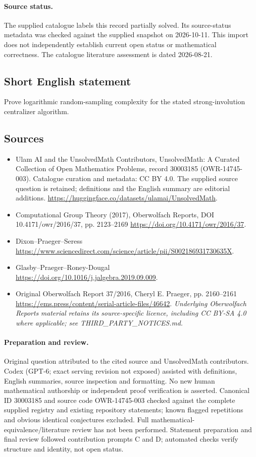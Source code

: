 \documentclass[11pt]{article}
\begin{document}
\paragraph{Source status.}
The supplied catalogue labels this record partially solved. Its source-status metadata was checked against the supplied snapshot on 2026-10-11. This import does not independently establish current open status or mathematical correctness. The catalogue literature assessment is dated 2026-08-21.
\subsection{Short English statement}
Prove logarithmic random-sampling complexity for the stated strong-involution centralizer algorithm.
\subsection{Sources}
\begin{itemize}
\item[\hypertarget{source:30003185:1}{S1}] Ulam AI and the UnsolvedMath Contributors, UnsolvedMath: A Curated Collection of Open Mathematics Problems, record 30003185 (OWR-14745-003). Catalogue curation and metadata: CC BY 4.0. The supplied source question is retained; definitions and the English summary are editorial additions.
\url{https://huggingface.co/datasets/ulamai/UnsolvedMath}.
\item[\hypertarget{source:30003185:2}{S2}] Computational Group Theory (2017), Oberwolfach Reports, DOI 10.4171/owr/2016/37, pp. 2123--2169
\url{https://doi.org/10.4171/owr/2016/37}.
\item[\hypertarget{source:30003185:3}{S3}] Dixon--Praeger--Seress
\url{https://www.sciencedirect.com/science/article/pii/S002186931730635X}.
\item[\hypertarget{source:30003185:4}{S4}] Glasby--Praeger--Roney-Dougal
\url{https://doi.org/10.1016/j.jalgebra.2019.09.009}.
\item[\hypertarget{source:30003185:5}{S5}] Original Oberwolfach Report 37/2016, Cheryl E. Praeger, pp. 2160--2161
\url{https://ems.press/content/serial-article-files/46642}.
\textit{Underlying Oberwolfach Reports material retains its source-specific licence, including CC BY-SA 4.0 where applicable; see THIRD\_PARTY\_NOTICES.md.}
\end{itemize}
\paragraph{Preparation and review.}
Original question attributed to the cited source and UnsolvedMath contributors. Codex (GPT-6; exact serving revision not exposed) assisted with definitions, English summaries, source inspection and formatting. No new human mathematical authorship or independent proof verification is asserted. Canonical ID 30003185 and source code OWR-14745-003 checked against the complete supplied registry and existing repository statements; known flagged repetitions and obvious identical conjectures excluded. Full mathematical-equivalence/literature review has not been performed. Statement preparation and final review followed contribution prompts C and D; automated checks verify structure and identity, not open status.
\label{end:30003185}
\end{document}
